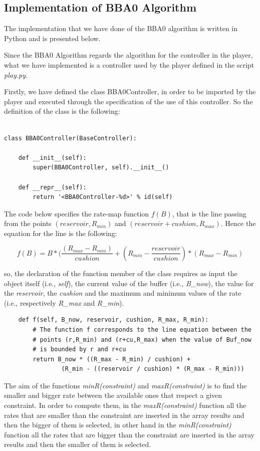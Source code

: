 \documentclass[a4paper]{report}
\begin{document}
\subsection{Implementation of BBA0 Algorithm}
The implementation that we have done of the BBA0 algorithm is written in Python and is presented below.

Since the BBA0 Algorithm regards the algorithm for the controller in the player, what we have implemented is a controller used by the player defined in the script \textit{play.py}.

Firstly, we have defined the class BBA0Controller, in order to be imported by the player and executed through the specification of the use of this controller. So the definition of the class is the following:
\begin{Verbatim}

class BBA0Controller(BaseController):

    def __init__(self):
        super(BBA0Controller, self).__init__()

    def __repr__(self):
        return '<BBA0Controller-%d>' % id(self)
\end{Verbatim}


The code below specifies the rate-map function $f(B)$, that is the line passing from the points $(reservoir, R_{min})$ and $(reservoir+cushion, R_{max})$. Hence the equation for the line is the following:

\[
f(B) = B *(\frac{(R_{max} - R_{min})}{cushion} + (R_{min} - \frac{reservoir}{cushion}) * (R_{max} - R_{min})
\]

so, the declaration of the function member of the class requires as input the object itself (i.e., \textit{self}), the current value of the buffer (i.e., \textit{B\_now}), the value for the \textit{reservoir}, the \textit{cushion} and the maximum and minimum values of the rate (i.e., respectively \textit{R\_max} and \textit{R\_min}).

\begin{Verbatim}
    def f(self, B_now, reservoir, cushion, R_max, R_min):
        # The function f corresponds to the line equation between the 
        # points (r,R_min) and (r+cu,R_max) when the value of Buf_now 
        # is bounded by r and r+cu
        return B_now * ((R_max - R_min) / cushion) + 
        		(R_min - ((reservoir / cushion) * (R_max - R_min)))
\end{Verbatim}

The aim of the functions \textit{minR(constraint)} and \textit{maxR(constraint)} is to find the smaller and bigger rate between the available ones that respect a given constraint. In order to compute them, in the \textit{maxR(constraint)} function all the rates that are smaller than the constraint are inserted in the array results and then the bigger of them is selected, in other hand in the \textit{minR(constraint)} function all the rates that are bigger than the constraint are inserted in the array results and then the smaller of them is selected.
\end{document}

